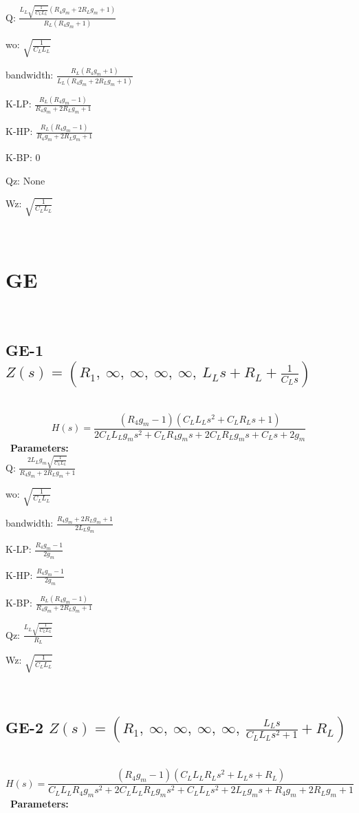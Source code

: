 \documentclass{article}
\begin{document}
Q: $\frac{L_{L} \sqrt{\frac{1}{C_{L} L_{L}}} \left(R_{4} g_{m} + 2 R_{L} g_{m} + 1\right)}{R_{L} \left(R_{4} g_{m} + 1\right)}$\ 

wo: $\sqrt{\frac{1}{C_{L} L_{L}}}$\ 

bandwidth: $\frac{R_{L} \left(R_{4} g_{m} + 1\right)}{L_{L} \left(R_{4} g_{m} + 2 R_{L} g_{m} + 1\right)}$\ 

K-LP: $\frac{R_{L} \left(R_{4} g_{m} - 1\right)}{R_{4} g_{m} + 2 R_{L} g_{m} + 1}$\ 

K-HP: $\frac{R_{L} \left(R_{4} g_{m} - 1\right)}{R_{4} g_{m} + 2 R_{L} g_{m} + 1}$\ 

K-BP: $0$\ 

Qz: $\text{None}$\ 

Wz: $\sqrt{\frac{1}{C_{L} L_{L}}}$\ 

\ 

\section{GE}\ 
\subsection{GE-1 $Z(s) = \left( R_{1}, \  \infty, \  \infty, \  \infty, \  \infty, \  L_{L} s + R_{L} + \frac{1}{C_{L} s}\right)$ } \ 
\textbf{\[H(s) = \frac{\left(R_{4} g_{m} - 1\right) \left(C_{L} L_{L} s^{2} + C_{L} R_{L} s + 1\right)}{2 C_{L} L_{L} g_{m} s^{2} + C_{L} R_{4} g_{m} s + 2 C_{L} R_{L} g_{m} s + C_{L} s + 2 g_{m}}\] } \ 
\textbf{Parameters:}\\ 

Q: $\frac{2 L_{L} g_{m} \sqrt{\frac{1}{C_{L} L_{L}}}}{R_{4} g_{m} + 2 R_{L} g_{m} + 1}$\ 

wo: $\sqrt{\frac{1}{C_{L} L_{L}}}$\ 

bandwidth: $\frac{R_{4} g_{m} + 2 R_{L} g_{m} + 1}{2 L_{L} g_{m}}$\ 

K-LP: $\frac{R_{4} g_{m} - 1}{2 g_{m}}$\ 

K-HP: $\frac{R_{4} g_{m} - 1}{2 g_{m}}$\ 

K-BP: $\frac{R_{L} \left(R_{4} g_{m} - 1\right)}{R_{4} g_{m} + 2 R_{L} g_{m} + 1}$\ 

Qz: $\frac{L_{L} \sqrt{\frac{1}{C_{L} L_{L}}}}{R_{L}}$\ 

Wz: $\sqrt{\frac{1}{C_{L} L_{L}}}$\ 

\ 

\subsection{GE-2 $Z(s) = \left( R_{1}, \  \infty, \  \infty, \  \infty, \  \infty, \  \frac{L_{L} s}{C_{L} L_{L} s^{2} + 1} + R_{L}\right)$ } \ 
\textbf{\[H(s) = \frac{\left(R_{4} g_{m} - 1\right) \left(C_{L} L_{L} R_{L} s^{2} + L_{L} s + R_{L}\right)}{C_{L} L_{L} R_{4} g_{m} s^{2} + 2 C_{L} L_{L} R_{L} g_{m} s^{2} + C_{L} L_{L} s^{2} + 2 L_{L} g_{m} s + R_{4} g_{m} + 2 R_{L} g_{m} + 1}\] } \ 
\textbf{Parameters:}\\ 
\end{document}
